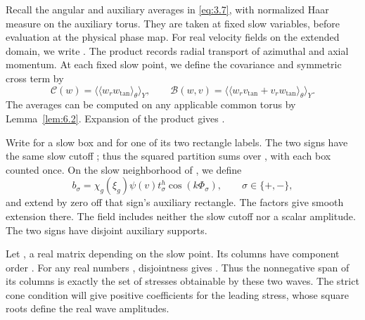 Recall the angular and auxiliary averages in \eqref{eq:3.7}, with normalized
Haar measure on the auxiliary torus. They are taken at fixed slow variables,
before evaluation at the physical phase map. For real velocity fields
 on the extended domain, we write
.
%
The product  records radial transport
of azimuthal and axial momentum. At each fixed slow point, we define the
covariance  and symmetric cross term
 by
\begin{equation}
  \mathcal C(w)=\bigl\langle\langle w_rw_{\mathrm{tan}}\rangle_\theta\bigr\rangle_Y,
  \qquad
  \mathcal B(w,v)=\bigl\langle\langle
  w_rv_{\mathrm{tan}}+v_rw_{\mathrm{tan}}
  \rangle_\theta\bigr\rangle_Y.
  \tag{7.23}\label{eq:7.23}
\end{equation}
The averages can be computed on any applicable common torus by
Lemma~\ref{lem:6.2}. Expansion of the product gives
.

Write  for a slow box and
 for one of its two rectangle
labels. The two signs have the same slow cutoff
; thus the
squared partition sums over , with each box counted
once. On the slow neighborhood of , we define
\[
  b_\sigma=\chi_g(\xi_g)\psi(v)t^h_\sigma\cos(k\Phi_\sigma),
  \qquad \sigma\in\{+,-\},
\]
and extend by zero off that sign's auxiliary rectangle. The factors
 give smooth extension there. The field
 includes neither the slow cutoff
 nor a scalar amplitude. The two signs have
disjoint auxiliary supports.

Let , a real
 matrix depending on the slow point. Its columns
have component order . For any real numbers
, disjointness gives
. Thus the
nonnegative span of its columns is exactly the set of stresses obtainable by
these two waves. The strict cone condition will give positive coefficients for
the leading stress, whose square roots define the real wave amplitudes.


